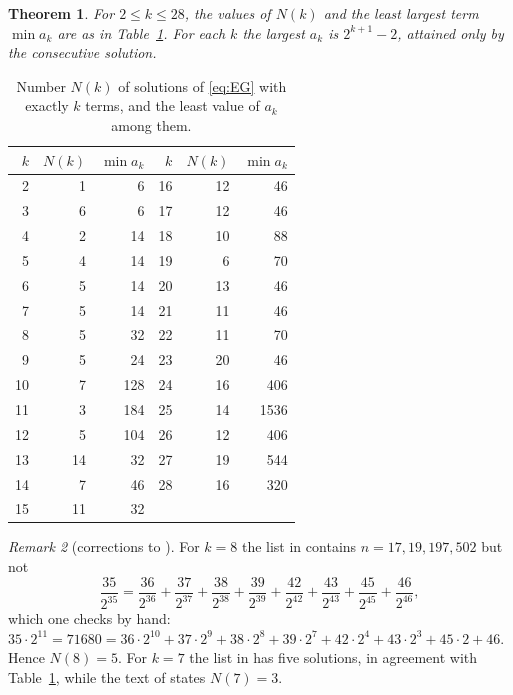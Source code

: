 \documentclass[11pt]{amsart}
\newtheorem{theorem}{Theorem}[section]
\theoremstyle{definition}
\theoremstyle{remark}
\newtheorem{remark}[theorem]{Remark}
\begin{document}
\begin{theorem}\label{thm:Nk}
For $2\le k\le28$, the values of $N(k)$ and the least largest term $\min a_k$ are as in Table~\ref{tab:Nk}. For each $k$ the largest $a_k$ is $2^{k+1}-2$, attained only by the consecutive solution.
\end{theorem}

\begin{table}[ht]
\centering\small
\begin{tabular}{r r r @{\qquad} r r r}
\toprule
$k$ & $N(k)$ & $\min a_k$ & $k$ & $N(k)$ & $\min a_k$\\
\midrule
2 & 1 & 6 & 16 & 12 & 46\\
3 & 6 & 6 & 17 & 12 & 46\\
4 & 2 & 14 & 18 & 10 & 88\\
5 & 4 & 14 & 19 & 6 & 70\\
6 & 5 & 14 & 20 & 13 & 46\\
7 & 5 & 14 & 21 & 11 & 46\\
8 & 5 & 32 & 22 & 11 & 70\\
9 & 5 & 24 & 23 & 20 & 46\\
10 & 7 & 128 & 24 & 16 & 406\\
11 & 3 & 184 & 25 & 14 & 1536\\
12 & 5 & 104 & 26 & 12 & 406\\
13 & 14 & 32 & 27 & 19 & 544\\
14 & 7 & 46 & 28 & 16 & 320\\
15 & 11 & 32 & & & \\
\bottomrule
\end{tabular}
\caption{Number $N(k)$ of solutions of \eqref{eq:EG} with exactly $k$ terms, and the least value of $a_k$ among them.}\label{tab:Nk}
\end{table}

\begin{remark}[corrections to \cite{TUZ}]
For $k=8$ the list in \cite[Thm.~2.5]{TUZ} contains $n=17,19,197,502$ but not
\[
\frac{35}{2^{35}}=\frac{36}{2^{36}}+\frac{37}{2^{37}}+\frac{38}{2^{38}}+\frac{39}{2^{39}}+\frac{42}{2^{42}}+\frac{43}{2^{43}}+\frac{45}{2^{45}}+\frac{46}{2^{46}},
\]
which one checks by hand: $35\cdot2^{11}=71680=36\cdot2^{10}+37\cdot2^9+38\cdot2^8+39\cdot2^7+42\cdot2^4+43\cdot2^3+45\cdot2+46$. Hence $N(8)=5$. For $k=7$ the list in \cite[Thm.~2.5]{TUZ} has five solutions, in agreement with Table~\ref{tab:Nk}, while the text of \cite[\S3]{TUZ} states $N(7)=3$.
\end{remark}
\end{document}
